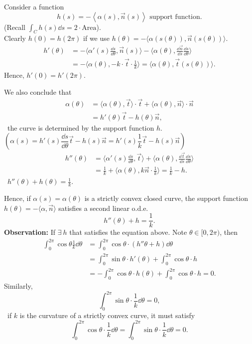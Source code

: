 Consider a function
\[
    h(s)=-\left<\alpha(s),\vec{n}(s)\right>\text{ support function}.
\]
(Recall $\int_C h(s)\dd s=2\cdot\mathrm{Area}$).\\
Clearly $h(0)=h(2\pi)$ if
 we use 
 $h(\theta)=-\langle\alpha\left(s(\theta)\right),\vec{n}\left(s(\theta)\right)\rangle$. 
 \begin{align*}
    h'(\theta)&=-\langle \alpha'(s)\frac{\dd s}{\dd\theta},\vec{n}(s)\rangle
    -\langle \alpha(\theta),\frac{\dd \vec{n}}{\dd s}\frac{\dd s}{\dd \theta}\rangle\\
    &=-\langle \alpha(\theta),-k\cdot\vec{t}\cdot\frac{1}{k}\rangle =\langle\alpha(\theta),\vec{t}\left(s(\theta)\right)\rangle
.\end{align*}
Hence, $h'(0)=h'(2\pi)$.

We also conclude that
\begin{align*}
    \alpha(\theta)&=\langle \alpha(\theta), \vec{t}\rangle \cdot \vec{t}
    +\langle \alpha(\theta), \vec{n}\rangle \cdot \vec{n}\\
    &=h'(\theta)\vec{t}-h(\theta)\vec{n}
,\end{align*}
\ie\ the curve is determined by the support function $h$. \\
$\left(\alpha(s)=h'(s)\dfrac{\dd s}{\dd \theta}\vec{t}-h(s)\vec{n}=h'(s)\dfrac{1}{k}\vec{t}-h(s)\vec{n}\right)$
\begin{align*}
    h''(\theta)&=\langle \alpha'(s)\frac{\dd s}{\dd \theta},\vec{t}\rangle
    +\langle \alpha(\theta),\frac{\dd \vec{t}}{\dd s}\frac{\dd s}{\dd \theta}
    \rangle\\
    &=\frac{1}{k}+\langle\alpha(\theta),k\vec{n}\cdot \frac{1}{k}\rangle=\frac{1}{k}-h
.\end{align*}
\ie\ $\boxed{h''(\theta)+h(\theta)=\frac{1}{k}}$.

Hence, if $\alpha(s)=\alpha(\theta)$ is a strictly convex closed curve, the
support function $h(\theta)=-\langle\alpha,\vec{n}\rangle$ satisfies a second
linear o.d.e.
\[h''(\theta)+h=\frac{1}{k}.\]
\textbf{Observation:} If $\exists~h$ that satisfies the equation above.
Note $\theta\in [0,2\pi)$, then
\begin{align*}
    \int_0^{2\pi}\cos\theta\frac{1}{k}\dd \theta&=
    \int_0^{2\pi} \cos\theta\cdot\left(h''\theta+h\right)\dd \theta\\
    &=\int_0^{2\pi}\sin\theta\cdot h'(\theta)+\int_0^{2\pi}\cos \theta \cdot h\\
    &=-\int_0^{2\pi}\cos\theta \cdot h(\theta)+\int_0^{2\pi}\cos\theta \cdot h=0
.\end{align*}
Similarly,
\[\int_0^{2\pi}\sin\theta\cdot\frac{1}{k}\dd \theta=0,\]
\ie\ if $k$ is the curvature of a strictly convex curve, it must satisfy
\[
    \int_0^{2\pi}\cos\theta\cdot\frac{1}{k}\dd \theta
    =\int_0^{2\pi}\sin\theta\cdot\frac{1}{k}\dd \theta
    =0
.\]

